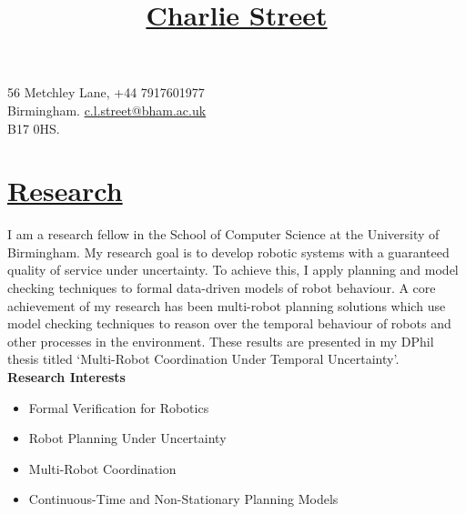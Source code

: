 \documentclass[11pt]{article}
\title{\vspace{-70pt}\Huge\underline{Charlie Street}}
\date{}
\begin{document}
\maketitle
\vspace*{-60pt}

\begin{flushleft}
\noindent
\large 56 Metchley Lane,
\hfill 
\large +44 7917601977 \\
\large Birmingham. 
\hfill
\large
\large \href{mailto:c.l.street@bham.ac.uk}{\url{c.l.street@bham.ac.uk}} \\
\large B17 0HS.
\iffalse
\hfill
\large
\href{https://www.birmingham.ac.uk/staff/profiles/computer-science/research-fellow/street-charlie.aspx}{\texttt{UoB Staff Profile}}\fi \\
\end{flushleft}
	
\section*{\uline{Research}}	

I am a research fellow in the School of Computer Science at the University of Birmingham.
%
My research goal is to develop robotic systems with a guaranteed quality of service under uncertainty.
%
To achieve this, I apply planning and model checking techniques to formal data-driven models of robot behaviour.
%
A core achievement of my research has been multi-robot planning solutions which use model checking techniques to reason over the temporal behaviour of robots and other processes in the environment.
%
These results are presented in my DPhil thesis titled `Multi-Robot Coordination Under Temporal Uncertainty'.\\

\iffalse
NEEDS UPDATE:
I am a postdoctoral research assistant in the Goal-Oriented Autonomous Long-Lived Systems (GOALS) Lab at the Oxford Robotics Institute, University of Oxford.
%
My current research is focused on the robust continuous-time coordination of multi-robot systems under uncertainty.
%
To achieve this, I apply planning, model checking, and task allocation techniques to continuous-time models of multi-robot behaviour.\\
\fi

\noindent \textbf{Research Interests}
\begin{itemize}
    \item Formal Verification for Robotics 
    \item Robot Planning Under Uncertainty
    \item Multi-Robot Coordination
    \item Continuous-Time and Non-Stationary Planning Models
\end{itemize}
\end{document}
